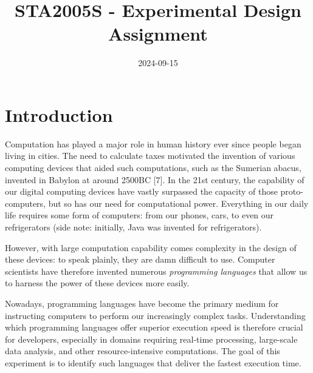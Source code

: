 \documentclass[12pt,halfline,a4paper,]{ouparticle}
\begin{document}
\title{STA2005S - Experimental Design Assignment}

\author{%
%
%
%
%
%
%
%
%
%
\and
{}
%
%
%
%
%
%
}

\abstract{}

\date{2024-09-15}

\keywords{}

\maketitle



\newpage 
\tableofcontents 
\listoffigures
\listoftables
\newpage

\newpage

\section{Introduction}\label{introduction}

Computation has played a major role in human history ever since people
began living in cities. The need to calculate taxes motivated the
invention of various computing devices that aided such computations,
such as the Sumerian abacus, invented in Babylon at around 2500BC
{[}7{]}. In the 21st century, the capability of our digital computing
devices have vastly surpassed the capacity of those proto-computers, but
so has our need for computational power. Everything in our daily life
requires some form of computers: from our phones, cars, to even our
refrigerators (side note: initially, Java was invented for
refrigerators).

However, with large computation capability comes complexity in the
design of these devices: to speak plainly, they are damn difficult to
use. Computer scientists have therefore invented numerous
\emph{programming languages} that allow us to harness the power of these
devices more easily.

Nowadays, programming languages have become the primary medium for
instructing computers to perform our increasingly complex tasks.
Understanding which programming languages offer superior execution speed
is therefore crucial for developers, especially in domains requiring
real-time processing, large-scale data analysis, and other
resource-intensive computations. The goal of this experiment is to
identify such languages that deliver the fastest execution time.
\end{document}
